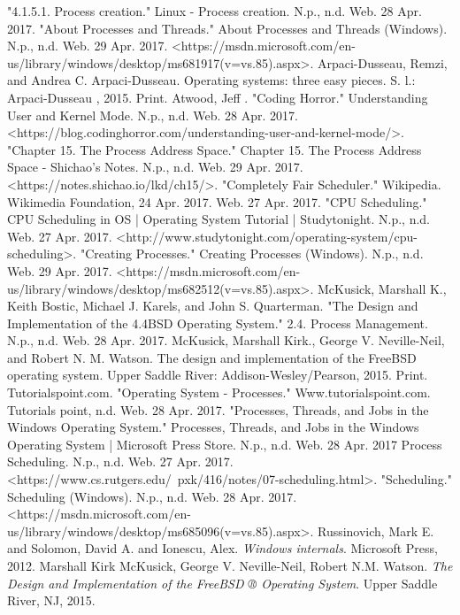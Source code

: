 \documentclass[onecolumn, draftclsnofoot,10pt, compsoc]{IEEEtran}
\begin{document}
\begin{thebibliography}{7}
 "4.1.5.1. Process creation." Linux - Process creation. N.p., n.d. Web. 28 Apr. 2017.
 "About Processes and Threads." About Processes and Threads (Windows). N.p., n.d. Web. 29 Apr.
2017. <https://msdn.microsoft.com/en-us/library/windows/desktop/ms681917(v=vs.85).aspx>.
 Arpaci-Dusseau, Remzi, and Andrea C. Arpaci-Dusseau. Operating systems: three easy pieces. S. l.: Arpaci-Dusseau , 2015. Print.
 Atwood, Jeff . "Coding Horror." Understanding User and Kernel Mode. N.p., n.d. Web. 28 Apr. 2017. <https://blog.codinghorror.com/understanding-user-and-kernel-mode/>.
 "Chapter 15. The Process Address Space." Chapter 15. The Process Address Space - Shichao's Notes. N.p., n.d. Web. 29 Apr. 2017. <https://notes.shichao.io/lkd/ch15/>.
 "Completely Fair Scheduler." Wikipedia. Wikimedia Foundation, 24 Apr. 2017. Web. 27 Apr. 2017.
 "CPU Scheduling." CPU Scheduling in OS | Operating System Tutorial | Studytonight. N.p., n.d. Web. 27 Apr. 2017. <http://www.studytonight.com/operating-system/cpu-scheduling>.
 "Creating Processes." Creating Processes (Windows). N.p., n.d. Web. 29 Apr. 2017. <https://msdn.microsoft.com/en-us/library/windows/desktop/ms682512(v=vs.85).aspx>.
 McKusick, Marshall K., Keith Bostic, Michael J. Karels, and John S. Quarterman. "The Design and Implementation of the 4.4BSD Operating System." 2.4. Process Management. N.p., n.d. Web. 28 Apr. 2017.
    McKusick, Marshall Kirk., George V. Neville-Neil, and Robert N. M. Watson. The design and implementation of the FreeBSD operating system. Upper Saddle River: Addison-Wesley/Pearson, 2015. Print.
    Tutorialspoint.com. "Operating System - Processes." Www.tutorialspoint.com. Tutorials point, n.d. Web. 28 Apr. 2017.
    "Processes, Threads, and Jobs in the Windows Operating System." Processes, Threads, and Jobs in the Windows Operating System | Microsoft Press Store. N.p., n.d. Web. 28 Apr. 2017
    Process Scheduling. N.p., n.d. Web. 27 Apr. 2017. <https://www.cs.rutgers.edu/~pxk/416/notes/07-scheduling.html>.
    "Scheduling." Scheduling (Windows). N.p., n.d. Web. 28 Apr. 2017. <https://msdn.microsoft.com/en-us/library/windows/desktop/ms685096(v=vs.85).aspx>.
Russinovich, Mark E. and Solomon, David A. and Ionescu, Alex.
\textit{Windows internals}. 
Microsoft Press, 2012.
Marshall Kirk McKusick, George V. Neville-Neil, Robert N.M. Watson.
\textit{The Design and Implementation of the FreeBSD ® Operating System}. 
Upper Saddle River, NJ, 2015.
\end{thebibliography}
\end{document}
